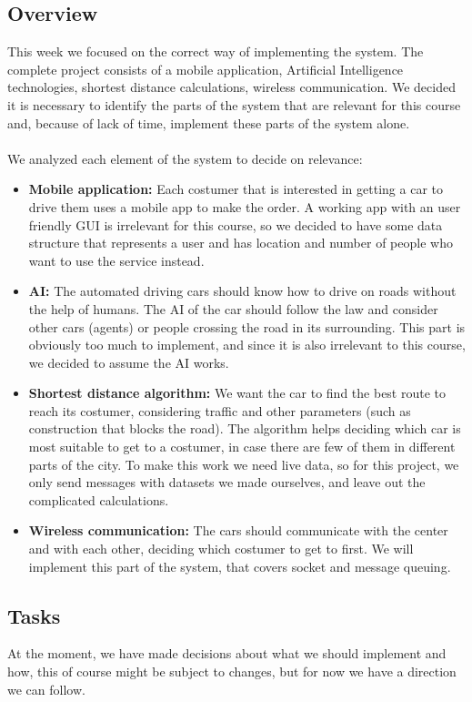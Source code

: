 \documentclass[a4paper]{article}
\begin{document}
\subsection*{Overview}
This week we focused on the correct way of implementing the system. The complete project consists of a mobile application, Artificial Intelligence technologies, shortest distance calculations, wireless communication. We decided it is necessary to identify the parts of the system that are relevant for this course and, because of lack of time, implement these parts of the system alone.
\\\\We analyzed each element of the system to decide on relevance:
\begin{itemize}
    \item \textbf{Mobile application:} Each costumer that is interested in getting a car to drive them uses a mobile app to make the order. A working app with an user friendly GUI is irrelevant for this course, so we decided to have some data structure that represents a user and has location and number of people who want to use the service instead.
    \item \textbf{AI:} The automated driving cars should know how to drive on roads without the help of humans. The AI of the car should follow the law and consider other cars (agents) or people crossing the road in its surrounding. This part is obviously too much to implement, and since it is also irrelevant to this course, we decided to assume the AI works.
    \item \textbf{Shortest distance algorithm:} We want the car to find the best route to reach its costumer, considering traffic and other parameters (such as construction that blocks the road). The algorithm helps deciding which car is most suitable to get to a costumer, in case there are few of them in different parts of the city. To make this work we need live data, so for this project, we only send messages with datasets we made ourselves, and leave out the complicated calculations.
    \item \textbf{Wireless communication:} The cars should communicate with the center and with each other, deciding which costumer to get to first. We will implement this part of the system, that covers socket and message queuing.
\end{itemize}

\subsection*{Tasks}
At the moment, we have made decisions about what we should implement and how, this of course might be subject to changes, but for now we have a direction we can follow.
\end{document}
